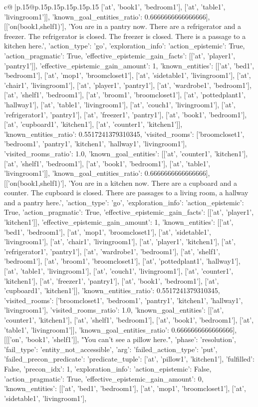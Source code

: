 \documentclass{article}
\begin{document}
{\begin{supertabular}{c@{$\;$}|p{.15\linewidth}@{}p{.15\linewidth}p{.15\linewidth}p{.15\linewidth}p{.15\linewidth}p{.15\linewidth}}
{{{['at', 'book1', 'bedroom1'], ['at', 'table1', 'livingroom1']], 'known_goal_entities_ratio': 0.6666666666666666}}], [['on(book1,shelf1)'], 'You are in a pantry now. There are a refrigerator and a freezer. The refrigerator is closed. The freezer is closed. There is a passage to a kitchen here.', {'action_type': 'go', 'exploration_info': {'action_epistemic': True, 'action_pragmatic': True, 'effective_epistemic_gain_facts': [['at', 'player1', 'pantry1']], 'effective_epistemic_gain_amount': 1, 'known_entities': [['at', 'bed1', 'bedroom1'], ['at', 'mop1', 'broomcloset1'], ['at', 'sidetable1', 'livingroom1'], ['at', 'chair1', 'livingroom1'], ['at', 'player1', 'pantry1'], ['at', 'wardrobe1', 'bedroom1'], ['at', 'shelf1', 'bedroom1'], ['at', 'broom1', 'broomcloset1'], ['at', 'pottedplant1', 'hallway1'], ['at', 'table1', 'livingroom1'], ['at', 'couch1', 'livingroom1'], ['at', 'refrigerator1', 'pantry1'], ['at', 'freezer1', 'pantry1'], ['at', 'book1', 'bedroom1'], ['at', 'cupboard1', 'kitchen1'], ['at', 'counter1', 'kitchen1']], 'known_entities_ratio': 0.5517241379310345, 'visited_rooms': ['broomcloset1', 'bedroom1', 'pantry1', 'kitchen1', 'hallway1', 'livingroom1'], 'visited_rooms_ratio': 1.0, 'known_goal_entities': [['at', 'counter1', 'kitchen1'], ['at', 'shelf1', 'bedroom1'], ['at', 'book1', 'bedroom1'], ['at', 'table1', 'livingroom1']], 'known_goal_entities_ratio': 0.6666666666666666}}], [['on(book1,shelf1)'], 'You are in a kitchen now. There are a cupboard and a counter. The cupboard is closed. There are passages to a living room, a hallway and a pantry here.', {'action_type': 'go', 'exploration_info': {'action_epistemic': True, 'action_pragmatic': True, 'effective_epistemic_gain_facts': [['at', 'player1', 'kitchen1']], 'effective_epistemic_gain_amount': 1, 'known_entities': [['at', 'bed1', 'bedroom1'], ['at', 'mop1', 'broomcloset1'], ['at', 'sidetable1', 'livingroom1'], ['at', 'chair1', 'livingroom1'], ['at', 'player1', 'kitchen1'], ['at', 'refrigerator1', 'pantry1'], ['at', 'wardrobe1', 'bedroom1'], ['at', 'shelf1', 'bedroom1'], ['at', 'broom1', 'broomcloset1'], ['at', 'pottedplant1', 'hallway1'], ['at', 'table1', 'livingroom1'], ['at', 'couch1', 'livingroom1'], ['at', 'counter1', 'kitchen1'], ['at', 'freezer1', 'pantry1'], ['at', 'book1', 'bedroom1'], ['at', 'cupboard1', 'kitchen1']], 'known_entities_ratio': 0.5517241379310345, 'visited_rooms': ['broomcloset1', 'bedroom1', 'pantry1', 'kitchen1', 'hallway1', 'livingroom1'], 'visited_rooms_ratio': 1.0, 'known_goal_entities': [['at', 'counter1', 'kitchen1'], ['at', 'shelf1', 'bedroom1'], ['at', 'book1', 'bedroom1'], ['at', 'table1', 'livingroom1']], 'known_goal_entities_ratio': 0.6666666666666666}}], [[['on', 'book1', 'shelf1']], "You can't see a pillow here.", {'phase': 'resolution', 'fail_type': 'entity_not_accessible', 'arg': {'failed_action_type': 'put', 'failed_precon_predicate': {'predicate_tuple': ['at', 'pillow1', 'kitchen1'], 'fulfilled': False, 'precon_idx': 1}}, 'exploration_info': {'action_epistemic': False, 'action_pragmatic': True, 'effective_epistemic_gain_amount': 0, 'known_entities': [['at', 'bed1', 'bedroom1'], ['at', 'mop1', 'broomcloset1'], ['at', 'sidetable1', 'livingroom1'], }}}
\end{supertabular}}
\end{document}
